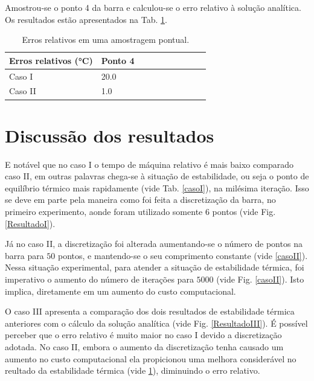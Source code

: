 \documentclass[12pt,a4paper,final]{report}%
\begin{document}
Amostrou-se o ponto 4 da barra e calculou-se o erro relativo à solução analítica. Os resultados estão apresentados na Tab. \ref{casoIII}.


\begin{table}[H]
\centering
\caption{Erros relativos em uma amostragem pontual.}
\label{casoIII}
\begin{tabular}{@{}llllllllll@{}}
\toprule
Erros relativos (°C)         &   Ponto 4     		\\ \midrule
Caso I		   				  &    20.0    			\\
Caso II	    				  &    1.0           	\\

\bottomrule
\end{tabular}
\end{table}


\section*{Discussão dos resultados}

E notável que no caso I o tempo de máquina relativo é mais baixo comparado caso II, em outras palavras chega-se à situação de estabilidade, ou seja o ponto de equilíbrio térmico mais rapidamente (vide Tab. \ref{casoI}), na milésima iteração. Isso se deve em parte pela maneira como foi feita a discretização da barra, no primeiro experimento, aonde foram utilizado somente $6$ pontos (vide Fig. \ref{ResultadoI}). 

Já no caso II, a discretização foi alterada aumentando-se o número de pontos na barra para $50$ pontos, e mantendo-se o seu comprimento constante (vide \ref{casoII}). Nessa situação experimental, para atender a situação de estabilidade térmica, foi imperativo o aumento do número de iterações para $5000$ (vide Fig. \ref{casoII}). Isto implica, diretamente em um aumento do custo computacional.

O caso III apresenta a comparação dos dois resultados de estabilidade térmica anteriores com o cálculo da solução analítica (vide Fig. \ref{ResultadoIII}). É possível perceber que o erro relativo é muito maior no caso I devido a discretização adotada. No caso II, embora o aumento da discretização tenha causado um aumento no custo computacional ela propicionou uma melhora considerável no reultado da estabilidade térmica (vide \ref{casoIII}), diminuindo o erro relativo.  





\end{document}

